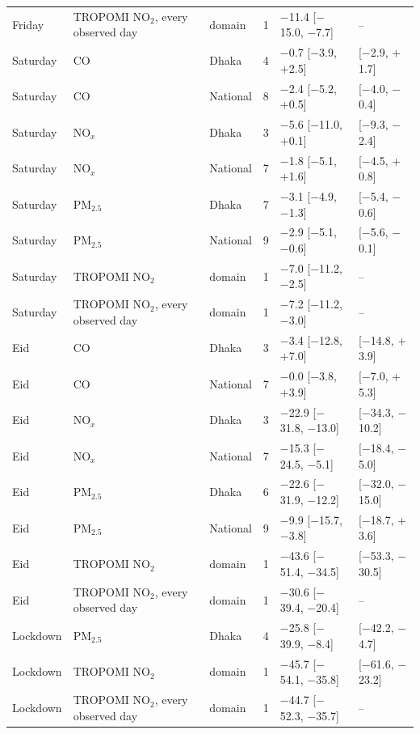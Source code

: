 \begin{longtable}{L{2.0cm} L{3.4cm} L{1.5cm} C{0.6cm} C{3.3cm} C{2.4cm}}
Friday & TROPOMI NO$_2$, every observed day & domain & 1 & $-$11.4 {\scriptsize[$-$15.0, $-$7.7]} & -- \\
Saturday & CO & Dhaka & 4 & $-$0.7 {\scriptsize[$-$3.9, $+$2.5]} & [$-$2.9, $+$1.7] \\
Saturday & CO & National & 8 & $-$2.4 {\scriptsize[$-$5.2, $+$0.5]} & [$-$4.0, $-$0.4] \\
Saturday & NO$_x$ & Dhaka & 3 & $-$5.6 {\scriptsize[$-$11.0, $+$0.1]} & [$-$9.3, $-$2.4] \\
Saturday & NO$_x$ & National & 7 & $-$1.8 {\scriptsize[$-$5.1, $+$1.6]} & [$-$4.5, $+$0.8] \\
Saturday & PM$_{2.5}$ & Dhaka & 7 & $-$3.1 {\scriptsize[$-$4.9, $-$1.3]} & [$-$5.4, $-$0.6] \\
Saturday & PM$_{2.5}$ & National & 9 & $-$2.9 {\scriptsize[$-$5.1, $-$0.6]} & [$-$5.6, $-$0.1] \\
Saturday & TROPOMI NO$_2$ & domain & 1 & $-$7.0 {\scriptsize[$-$11.2, $-$2.5]} & -- \\
Saturday & TROPOMI NO$_2$, every observed day & domain & 1 & $-$7.2 {\scriptsize[$-$11.2, $-$3.0]} & -- \\
Eid & CO & Dhaka & 3 & $-$3.4 {\scriptsize[$-$12.8, $+$7.0]} & [$-$14.8, $+$3.9] \\
Eid & CO & National & 7 & $-$0.0 {\scriptsize[$-$3.8, $+$3.9]} & [$-$7.0, $+$5.3] \\
Eid & NO$_x$ & Dhaka & 3 & $-$22.9 {\scriptsize[$-$31.8, $-$13.0]} & [$-$34.3, $-$10.2] \\
Eid & NO$_x$ & National & 7 & $-$15.3 {\scriptsize[$-$24.5, $-$5.1]} & [$-$18.4, $-$5.0] \\
Eid & PM$_{2.5}$ & Dhaka & 6 & $-$22.6 {\scriptsize[$-$31.9, $-$12.2]} & [$-$32.0, $-$15.0] \\
Eid & PM$_{2.5}$ & National & 9 & $-$9.9 {\scriptsize[$-$15.7, $-$3.8]} & [$-$18.7, $+$3.6] \\
Eid & TROPOMI NO$_2$ & domain & 1 & $-$43.6 {\scriptsize[$-$51.4, $-$34.5]} & [$-$53.3, $-$30.5] \\
Eid & TROPOMI NO$_2$, every observed day & domain & 1 & $-$30.6 {\scriptsize[$-$39.4, $-$20.4]} & -- \\
Lockdown & PM$_{2.5}$ & Dhaka & 4 & $-$25.8 {\scriptsize[$-$39.9, $-$8.4]} & [$-$42.2, $-$4.7] \\
Lockdown & TROPOMI NO$_2$ & domain & 1 & $-$45.7 {\scriptsize[$-$54.1, $-$35.8]} & [$-$61.6, $-$23.2] \\
Lockdown & TROPOMI NO$_2$, every observed day & domain & 1 & $-$44.7 {\scriptsize[$-$52.3, $-$35.7]} & -- \\

\end{longtable}
